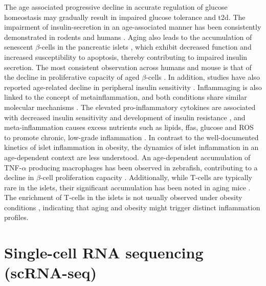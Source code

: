 

The age associated progressive decline in accurate regulation of glucose homeostasis may gradually result in impaired glucose tolerance and \gls{t2d}. The impairment of insulin-secretion in an age-associated manner has been consistently demonstrated in rodents and humans \textbf{\cite{sandovici_ageing_2016,muzumdar_decrease_2004}}. Aging also leads to the accumulation of senescent $\beta$-cells in the pancreatic islets \textbf{\cite{tuduri_pancreatic_2022}}, which exhibit decreased function and increased susceptibility to apoptosis, thereby contributing to impaired insulin secretion. The most consistent observation across humans and mouse is that of the decline in proliferative capacity of aged $\beta$-cells \textbf{\cite{tuduri_pancreatic_2022}}. In addition, studies have also reported age-related decline in peripheral insulin sensitivity \textbf{\cite{tuduri_pancreatic_2022}}. Inflammaging is also linked to the concept of metainflammation, and both conditions share similar molecular mechanisms \textbf{\cite{franceschi_inflammaging_2018,prattichizzo_inflammageing_2018}}. The elevated pro-inflammatory cytokines are associated with decreased insulin sensitivity and development of insulin resistance \textbf{\cite{rehman_mechanisms_2016}}, and meta-inflammation causes excess nutrients such as lipids, \glspl{ffa}, glucose and ROS to promote chronic, low-grade inflammation \textbf{\cite{frasca_aging_2017}}. In contrast to the well-documented kinetics of islet inflammation in obesity, the dynamics of islet inflammation in an age-dependent context are less understood. An age-dependent accumulation of TNF-$\alpha$ producing macrophages has been observed in zebrafish, contributing to a decline in $\beta$-cell proliferation capacity \textbf{\cite{janjuha_age-related_2018}}. Additionally, while T-cells are typically rare in the islets, their significant accumulation has been noted in aging mice \textbf{\cite{denroche_t_2021}}. The enrichment of T-cells in the islets is not usually observed under obesity conditions \textbf{\cite{eguchi_islet_2017}}, indicating that aging and obesity might trigger distinct inflammation profiles.


\clearpage
\section{Single-cell RNA sequencing (scRNA-seq)}  %
\label{sec:scrna}

